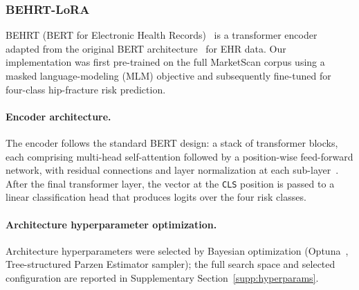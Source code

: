 \documentclass[12pt]{article}
\begin{document}
\subsubsection{BEHRT-LoRA}

BEHRT (BERT for Electronic Health Records)~\citep{Li2020BEHRT} is a transformer encoder adapted from the original BERT architecture~\citep{Devlin2019BERT,Vaswani2017Attention} for EHR data. Our implementation was first pre-trained on the full MarketScan corpus using a masked language-modeling (MLM) objective and subsequently fine-tuned for four-class hip-fracture risk prediction.

\paragraph{Encoder architecture.}
The encoder follows the standard BERT design: a stack of transformer blocks, each comprising multi-head self-attention followed by a position-wise feed-forward network, with residual connections and layer normalization at each sub-layer~\citep{Vaswani2017Attention}. After the final transformer layer, the vector at the \texttt{CLS} position is passed to a linear classification head that produces logits over the four risk classes.

\paragraph{Architecture hyperparameter optimization.}
Architecture hyperparameters were selected by Bayesian optimization (Optuna~\citep{Akiba2019Optuna}, Tree-structured Parzen Estimator sampler); the full search space and selected configuration are reported in Supplementary Section~\ref{supp:hyperparams}.
\end{document}
